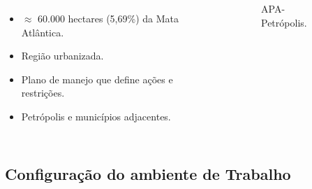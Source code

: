 \documentclass[%
  10pt,%
  aspectratio = 169,%
  compress,%
  t,%
  english,%
  brazilian,%
  tikz,
]{beamer}
\begin{document}
\begin{frame}
\begin{columns}[T]
\begin{itemize}
    \item $\approx$ 60.000 hectares (5,69\%) da Mata Atlântica.
    \item Região urbanizada.
    \item Plano de manejo que define ações e restrições.
    \item Petrópolis e municípios adjacentes.
\end{itemize}
\begin{figure}[!htb]
\centering%
\caption{APA-Petrópolis.}%
\end{figure}
\end{columns}
\end{frame}

\subsection{Configuração do ambiente de Trabalho}\label{ssec:matmet3}
\end{document}
